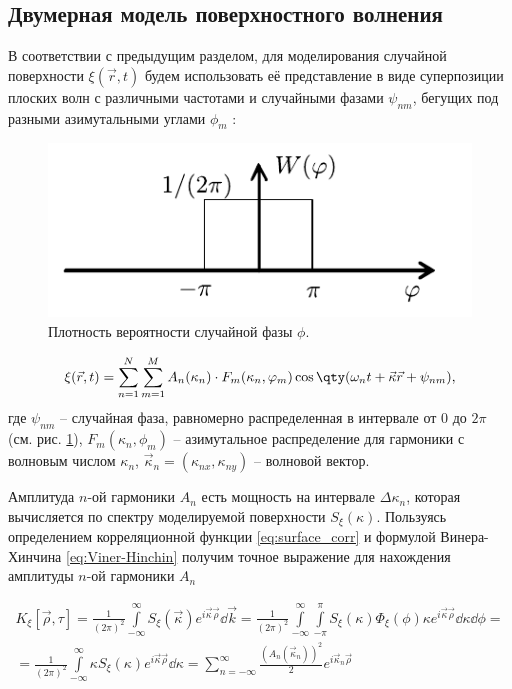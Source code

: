 \subsection{Двумерная модель поверхностного волнения}%
\label{sec:dvumernaia_model_poverkhnostnogo_volneniia}

В соответствии с предыдущим разделом, для моделирования случайной поверхности
$\xi(\vec r,t)$ будем использовать её представление в виде суперпозиции
плоских волн с различными частотами и случайными фазами $\psi_{nm}$, бегущих
под разными азимутальными углами $\phi_m$ \cite{karaev}:
\begin{figure}[H]
    \centering
    \includegraphics[scale=1]{fig/image65}
    \caption{Плотность вероятности случайной фазы $\phi$.}
    \label{fig:phase}
\end{figure}

\begin{equation}
    \label{eq:surface2d}
    \xi(\vec r,t) = \sum\limits_{n=1}^{N} \sum\limits_{m=1}^{M}
    A_n(\kappa_n) \cdot
    F_m(\kappa_n,\phi_m) \cos \qty(\omega_n t + \vec \kappa \vec r + \psi_{nm}),
\end{equation}
где $\psi_{nm}$ -- случайная фаза, равномерно распределенная в интервале от $0$
до $2 \pi$ (см. рис. \ref{fig:phase}), $F_m(\kappa_n, \phi_m)$ -- азимутальное
распределение для гармоники с волновым числом  $\kappa_n$,  $\vec \kappa_n =
(\kappa_{nx}, \kappa_{ny})$ -- 
волновой вектор. 

Амплитуда $n$-ой гармоники $A_n$ есть
мощность на интервале $\Delta \kappa_n$, которая вычисляется по спектру моделируемой
поверхности $S_\xi(\kappa)$. Пользуясь определением корреляционной
функции \eqref{eq:surface_corr} и формулой Винера-Хинчина
\eqref{eq:Viner-Hinchin} получим точное выражение для нахождения амплитуды
$n$-ой гармоники  $A_n$

\begin{gather}
    K_{\xi}[\vec \rho, \tau] = \frac{1}{(2 \pi)^2}  \int\limits_{-\infty}^{\infty}  S_{\xi}(\vec \kappa) e^{i \vec \kappa \vec \rho} \dd \vec k = 
    \frac{1}{(2 \pi)^2} 
        \int\limits_{-\infty}^{\infty}
        \int\limits_{- \pi}^{\pi} 
    S_\xi(\kappa) \Phi_\xi(\phi) \kappa e^{i \vec \kappa\vec \rho} \dd \kappa \dd \phi = \\
    = \frac{1}{(2 \pi)^2} \int\limits_{-\infty}^{\infty} \kappa S_\xi
    (\kappa) e^{i \vec \kappa 
    \vec \rho} \dd \kappa = \sum\limits_{n=-\infty}^{\infty} \frac{(A_n(\vec
\kappa_n))^2}{2} e^{i \vec \kappa_n \vec \rho} 
\end{gather}

